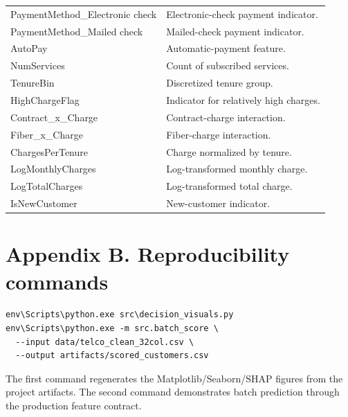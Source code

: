 \documentclass[9pt]{article}
\begin{document}
\begin{longtable}{p{}p{}}
PaymentMethod\_Electronic check & Electronic-check payment indicator.\\
PaymentMethod\_Mailed check & Mailed-check payment indicator.\\
AutoPay & Automatic-payment feature.\\
NumServices & Count of subscribed services.\\
TenureBin & Discretized tenure group.\\
HighChargeFlag & Indicator for relatively high charges.\\
Contract\_x\_Charge & Contract-charge interaction.\\
Fiber\_x\_Charge & Fiber-charge interaction.\\
ChargesPerTenure & Charge normalized by tenure.\\
LogMonthlyCharges & Log-transformed monthly charge.\\
LogTotalCharges & Log-transformed total charge.\\
IsNewCustomer & New-customer indicator.\\
\end{longtable}

\section*{Appendix B. Reproducibility commands}
\begin{verbatim}
env\Scripts\python.exe src\decision_visuals.py
env\Scripts\python.exe -m src.batch_score \
  --input data/telco_clean_32col.csv \
  --output artifacts/scored_customers.csv
\end{verbatim}
The first command regenerates the Matplotlib/Seaborn/SHAP figures from the project artifacts. The second command demonstrates batch prediction through the production feature contract.
\end{document}
